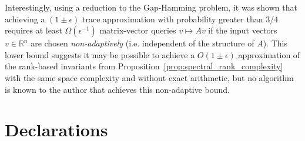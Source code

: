 \documentclass[pdflatex,sn-mathphys-num]{sn-jnl}
\begin{document}
Interestingly, using a reduction to the Gap-Hamming problem, it was shown that achieving a \((1 \pm \epsilon)\) trace approximation with probability greater than \(3/4\) requires at least \(\Omega(\epsilon^{- 1})\) matrix-vector queries \(v \mapsto Av\) if the input vectors \(v \in \mathbb{R}^{n}\) are chosen \emph{non-adaptively} \cite{meyer2021hutchpp} (i.e. independent of the structure of \(A\)). This lower bound suggests it may be possible to achieve a \(O(1 \pm \epsilon)\) approximation of the rank-based invariants from Proposition~\ref{prop:spectral_rank_complexity} with the same space complexity and without exact arithmetic, but no algorithm is known to the author that achieves this non-adaptive bound.

\backmatter
{}
\section*{Declarations}

%
\end{document}
